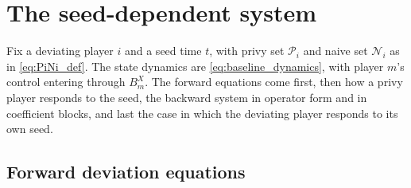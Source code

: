 
\section{The seed-dependent system}
\label{sec:fb_system}

Fix a deviating player $i$ and a seed time $t$, with privy set $\mathcal P_i$ and naive set $\mathcal N_i$ as in \eqref{eq:PiNi_def}.  The state dynamics are \eqref{eq:baseline_dynamics}, with player $m$'s control entering through $B^X_m$.  The forward equations come first, then how a privy player responds to the seed, the backward system in operator form and in coefficient blocks, and last the case in which the deviating player responds to its own seed.

\subsection{Forward deviation equations}

